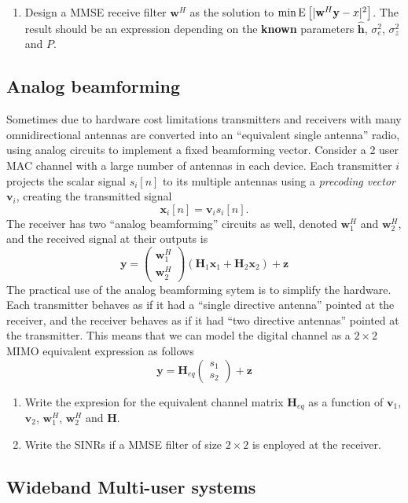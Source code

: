 \documentclass[a4paper,10pt]{article}
\newcommand{\Hb}{\mathbf{H}}
\newcommand{\h}{\mathbf{h}}
\newcommand{\x}{\mathbf{x}}
\newcommand{\s}{\mathbf{s}}
\newcommand{\vv}{\mathbf{v}}
\newcommand{\y}{\mathbf{y}}
\newcommand{\w}{\mathbf{w}}
\newcommand{\z}{\mathbf{z}}
\newcommand{\Ex}[2]{{\textnormal{E}_{#1}\left[#2\right]}}
\begin{document}
\begin{enumerate}
 \item Design a MMSE receive filter $\w^H$ as the solution to $\min\Ex{}{| \w^H\y - x |^2}$. The result should be an expression depending on the \textbf{known} parameters $\hat{\h}$, $\sigma_e^2$, $\sigma_z^2$ and $P$.
\end{enumerate}
 
\subsection{Analog beamforming}

Sometimes due to hardware cost limitations transmitters and receivers with many omnidirectional antennas are converted into an ``equivalent single antenna'' radio, using analog circuits to implement a fixed beamforming vector. Consider a 2 user MAC channel with a large number of antennas in each device. Each transmitter $i$ projects the scalar signal $s_i[n]$ to its multiple antennas using a \textit{precoding vector} $\vv_i$, creating the transmitted signal 
$$\x_i[n]=\vv_i s_i[n].$$
The receiver has two ``analog beamforming'' circuits as well, denoted $\w_1^H$ and $\w_2^H$, and the received signal at their outputs is
$$\y=\left(\begin{array}{c}\w_1^H\\\w_2^H\end{array}\right)\left(\Hb_1\x_1+\Hb_2\x_2\right)+\z$$
The practical use of the analog beamforming sytem is to simplify the hardware. Each transmitter behaves as if it had a ``single directive antenna'' pointed at the receiver, and the receiver behaves as if it had ``two directive antennas'' pointed at the transmitter. This means that we can model the digital channel as a $2\times2$ MIMO equivalent expression as follows
$$\y=\Hb_{eq}\left(\begin{array}{c}s_1\\s_2\end{array}\right)+\z$$
\begin{enumerate}
 \item Write the expresion for the equivalent channel matrix $\Hb_{eq}$ as a function of $\vv_1$,  $\vv_2$, $\w_1^H$, $\w_2^H$ and $\Hb$.
 \item Write the SINRs if a MMSE filter of size $2\times 2$ is enployed at the receiver.
\end{enumerate}



\subsection{Wideband Multi-user systems}
\end{document}
